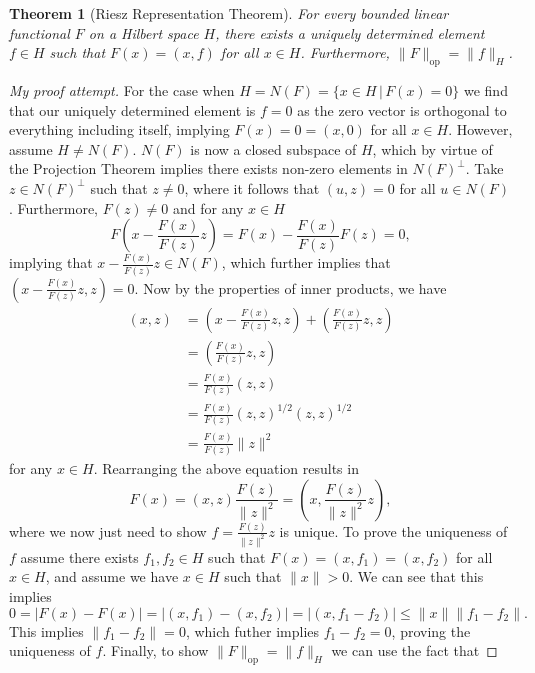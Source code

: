 \documentclass[11pt]{article}
\newtheorem{theorem}{Theorem}
\theoremstyle{definition}
\begin{document}
\begin{theorem}[Riesz Representation Theorem]
	For every bounded linear functional $F$ on a Hilbert space $H$, there exists a uniquely determined element $f \in H$
	such that $F(x) = (x,f)$ for all $x \in H$. Furthermore, $\|F\|_{\text{op}} = \|f\|_H$.
\end{theorem}
\begin{proof}[My proof attempt]
	For the case when $H = N(F) = \{x \in H \, | \, F(x) = 0\}$ we find that our uniquely determined element is $f=0$ as the zero vector is
	orthogonal to everything including itself, implying $F(x) = 0 = (x,0)$ for all $x \in H$. However, assume $H \not= N(F)$.
	$N(F)$ is now a closed subspace of $H$, which by virtue of the Projection Theorem implies there exists non-zero elements in $N(F)^{\bot}$.
	Take $z \in N(F)^{\bot}$ such that $z \not= 0$, where it follows that $(u,z) = 0$ for all $u \in N(F)$. Furthermore, $F(z) \not= 0$ and for any $x \in H$
	\[F\left(x - \frac{F(x)}{F(z)}z\right) = F(x) - \frac{F(x)}{F(z)}F(z) = 0,\]
	implying that $x - \frac{F(x)}{F(z)}z \in N(F)$, which further implies that $\left(x - \frac{F(x)}{F(z)}z, z\right) = 0$.
	Now by the properties of inner products, we have
	\begin{equation*}
		\begin{aligned}
			(x,z) &= \left(x - \frac{F(x)}{F(z)}z,z\right) + \left(\frac{F(x)}{F(z)}z,z\right) \\
			      &= \left(\frac{F(x)}{F(z)}z,z\right) \\
			      &= \frac{F(x)}{F(z)}(z,z) \\
			      &= \frac{F(x)}{F(z)}(z,z)^{1/2}(z,z)^{1/2} \\
			      &= \frac{F(x)}{F(z)}\|z\|^2
		\end{aligned}
	\end{equation*}
	for any $x \in H$. Rearranging the above equation results in 
	\[F(x) = (x,z)\frac{F(z)}{\|z\|^2} = \left(x,\frac{F(z)}{\|z\|^2}z\right),\]
	where we now just need to show $f = \frac{F(z)}{\|z\|^2}z$ is unique.
	To prove the uniqueness of $f$ assume there exists $f_1,f_2 \in H$ such that $F(x) = (x,f_1) = (x,f_2)$ for all $x \in H$,
	and assume we have $x \in H$ such that $\|x\| > 0$. We can see that this implies
	\begin{equation*}
		0 = |F(x) - F(x)| = |(x,f_1) - (x,f_2)| = |(x,f_1-f_2)| \leq \|x\|\|f_1 - f_2\|.
	\end{equation*}
	This implies $\|f_1-f_2\| = 0$, which futher implies $f_1-f_2= 0$, proving the uniqueness of $f$.
	Finally, to show $\|F\|_{\text{op}} = \|f\|_H$ we can use the fact that

\end{proof}
\end{document}
